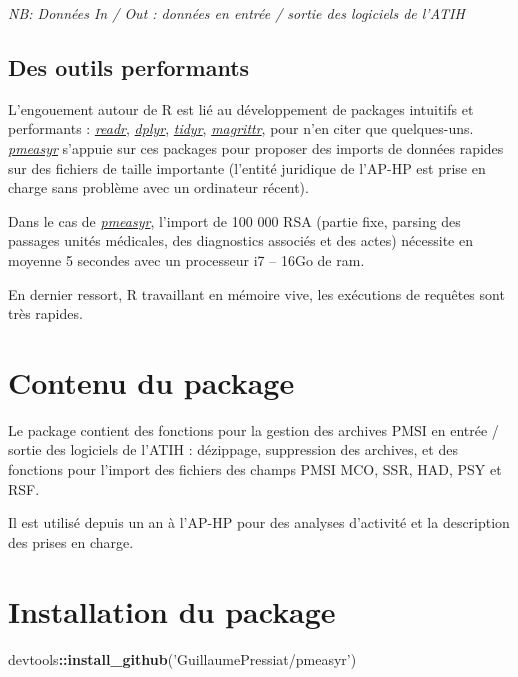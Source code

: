 \documentclass[]{book}
\newenvironment{Shaded}{\begin{snugshade}}{\end{snugshade}}
\newcommand{\KeywordTok}[1]{\textcolor[rgb]{0.13,0.29,0.53}{\textbf{#1}}}
\newcommand{\NormalTok}[1]{#1}
\newcommand{\OperatorTok}[1]{\textcolor[rgb]{0.81,0.36,0.00}{\textbf{#1}}}
\newcommand{\StringTok}[1]{\textcolor[rgb]{0.31,0.60,0.02}{#1}}
\begin{document}
\emph{NB: Données In / Out : données en entrée / sortie des logiciels de l'ATIH}

\hypertarget{des-outils-performants}{%
\subsection{Des outils performants}\label{des-outils-performants}}

L'engouement autour de R est lié au développement de packages intuitifs et performants : \href{http://readr.tidyverse.org}{\emph{readr}}, \href{https://github.com/hadley/dplyr}{\emph{dplyr}}, \href{http://tidyr.tidyverse.org}{\emph{tidyr}}, \href{https://github.com/tidyverse/magrittr}{\emph{magrittr}}, pour n'en citer que quelques-uns. \href{https://github.com/GuillaumePressiat/pmeasyr}{\emph{pmeasyr}} s'appuie sur ces packages pour proposer des imports de données rapides sur des fichiers de taille importante (l'entité juridique de l'AP-HP est prise en charge sans problème avec un ordinateur récent).

Dans le cas de \href{https://github.com/GuillaumePressiat/pmeasyr}{\emph{pmeasyr}}, l'import de 100 000 RSA (partie fixe, parsing des passages unités médicales, des diagnostics associés et des actes) nécessite en moyenne 5 secondes avec un processeur i7 -- 16Go de ram.

En dernier ressort, R travaillant en mémoire vive, les exécutions de requêtes sont très rapides.

\hypertarget{contenu-du-package}{%
\section{Contenu du package}\label{contenu-du-package}}

Le package contient des fonctions pour la gestion des archives PMSI en entrée / sortie des logiciels de l'ATIH : dézippage, suppression des archives, et des fonctions pour l'import des fichiers des champs PMSI MCO, SSR, HAD, PSY et RSF.

Il est utilisé depuis un an à l'AP-HP pour des analyses d'activité et la description des prises en charge.

\hypertarget{installation-du-package}{%
\section{Installation du package}\label{installation-du-package}}

\begin{Shaded}
\begin{Highlighting}[]
\NormalTok{devtools}\OperatorTok{::}\KeywordTok{install_github}\NormalTok{(}\StringTok{'GuillaumePressiat/pmeasyr'}\NormalTok{)}
\end{Highlighting}
\end{Shaded}
\end{document}
